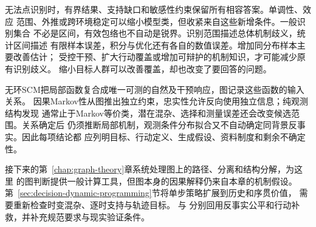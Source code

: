 无法点识别时，有界结果、支持缺口和敏感性约束保留所有相容答案。单调性、效应
范围、外推或跨环境稳定可以缩小模型类，但收紧来自这些新增条件。一般识别集合
不必是区间，有效包络也不自动是锐界。识别范围描述总体机制歧义，统计区间描述
有限样本误差，积分与优化还有各自的数值误差。增加同分布样本主要改善估计；
受控干预、扩大行动覆盖或增加可辩护的机制知识，才可能减少原有识别歧义。
缩小目标人群可以改善覆盖，却也改变了要回答的问题。

无环SCM把局部函数复合成唯一可测的自然及干预响应，图记录这些函数的输入关系。
因果Markov性从图推出独立约束，忠实性允许反向使用独立信息；纯观测结构发现
通常止于Markov等价类，潜在混杂、选择和测量误差还会改变候选范围。关系确定后
仍须推断局部机制，观测条件分布拟合又不自动确定同背景反事实。因此每项结论都
应列明目标、行动定义、生成假设、资料制度和剩余不确定性。

接下来的第~\ref{chap:graph-theory}章系统处理图上的路径、分离和结构分解，为这里
的图判断提供一般计算工具，但图本身的因果解释仍来自本章的机制假设。
第~\ref{sec:decision-dynamic-programming}节将单步策略扩展到历史和序贯价值，
需要重新检查时变混杂、逐时支持与轨迹目标。
与
分别回用反事实公平和行动补救，并补充规范要求与现实验证条件。
